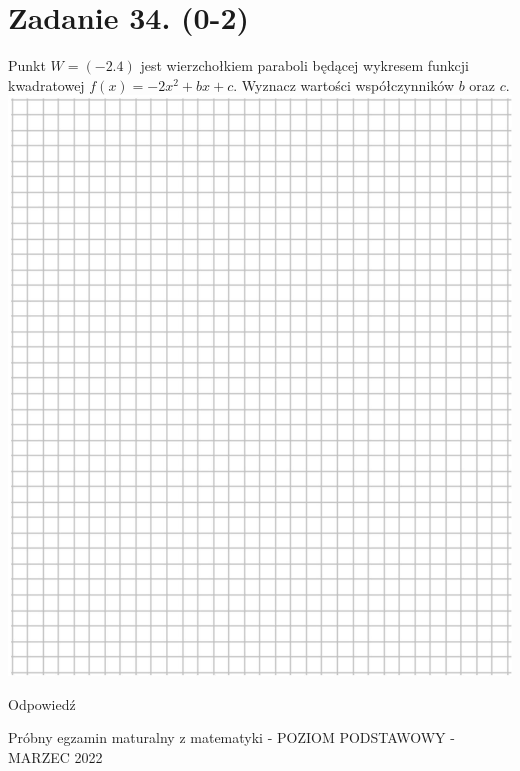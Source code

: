 \documentclass[10pt]{article}
\begin{document}
\section*{Zadanie 34. (0-2)}
Punkt \(W=(-2.4)\) jest wierzchołkiem paraboli będącej wykresem funkcji kwadratowej \(f(x)=-2 x^{2}+b x+c\). Wyznacz wartości współczynników \(b\) oraz \(c\).\\
\includegraphics[max width=\textwidth, center]{2024_11_21_fd555512e32c497e8a5dg-18}

Odpowiedź

Próbny egzamin maturalny z matematyki - POZIOM PODSTAWOWY - MARZEC 2022
\end{document}
